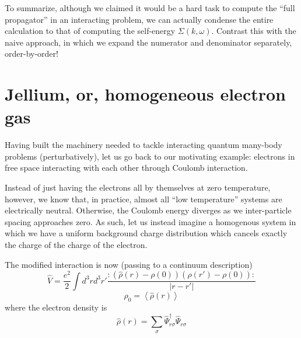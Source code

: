 To summarize, although we claimed it would be a hard task to compute the ``full propagator'' in an interacting problem, we can actually condense the entire calculation to that of computing the self-energy $\Sigma(k,\omega)$. Contrast this with the naive approach, in which we expand the numerator and denominator separately, order-by-order!

\section{Jellium, or, homogeneous electron gas}

Having built the machinery needed to tackle interacting quantum many-body problems (perturbatively), let us go back to our motivating example: electrons in free space interacting with each other through Coulomb interaction.

Instead of just having the electrons all by themselves at zero temperature, however, we know that, in practice, almost all ``low temperature'' systems are electrically neutral. Otherwise, the Coulomb energy diverges as we inter-particle spacing approaches zero. As such, let us instead imagine a homogenous system in which we have a uniform background charge distribution which cancels exactly the charge of the charge of the electron.

The modified interaction is now (passing to a continuum description)
\[ \hat{V}=\frac{e^2}{2}\int{d^3rd^3r'\frac{:\left( \hat{\rho}\left( r \right) -\rho \left( 0 \right) \right) \left( \hat{\rho}\left( r' \right) -\rho \left( 0 \right) \right) :}{\left| r-r' \right|}}\]
\[ \rho _0=\left< \hat{\rho}\left( r \right) \right> \]
where the electron density is
\[ \hat{\rho}\left( r \right) =\sum_{\sigma}{\hat{\Psi}_{r\sigma}^{\dagger}\hat{\Psi}_{r\sigma}}\]

